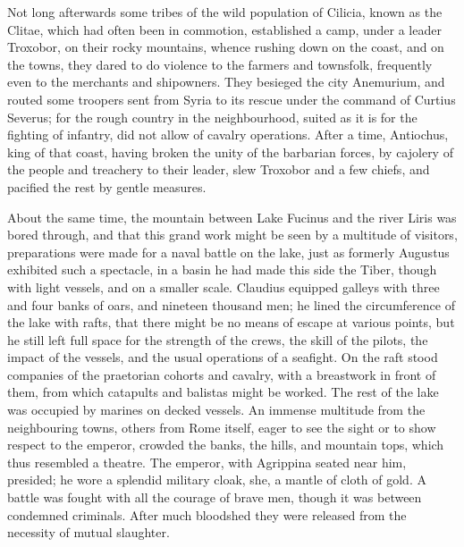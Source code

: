 
Not long afterwards some tribes of the wild population of Cilicia, known as the Clitae, which had often been in commotion, established a camp, under a leader Troxobor, on their rocky mountains, whence rushing down on the coast, and on the towns, they dared to do violence to the farmers and townsfolk, frequently even to the merchants and shipowners. They besieged the city Anemurium, and routed some troopers sent from Syria to its rescue under the command of Curtius Severus; for the rough country in the neighbourhood, suited as it is for the fighting of infantry, did not allow of cavalry operations. After a time, Antiochus, king of that coast, having broken the unity of the barbarian forces, by cajolery of the people and treachery to their leader, slew Troxobor and a few chiefs, and pacified the rest by gentle measures.


About the same time, the mountain between Lake Fucinus and the river Liris was bored through, and that this grand work might be seen by a multitude of visitors, preparations were made for a naval battle on the lake, just as formerly Augustus exhibited such a spectacle, in a basin he had made this side the Tiber, though with light vessels, and on a smaller scale. Claudius equipped galleys with three and four banks of oars, and nineteen thousand men; he lined the circumference of the lake with rafts, that there might be no means of escape at various points, but he still left full space for the strength of the crews, the skill of the pilots, the impact of the vessels, and the usual operations of a seafight. On the raft stood companies of the praetorian cohorts and cavalry, with a breastwork in front of them, from which catapults and balistas might be worked. The rest of the lake was occupied by marines on decked vessels. An immense multitude from the neighbouring towns, others from Rome itself, eager to see the sight or to show respect to the emperor, crowded the banks, the hills, and mountain tops, which thus resembled a theatre. The emperor, with Agrippina seated near him, presided; he wore a splendid military cloak, she, a mantle of cloth of gold. A battle was fought with all the courage of brave men, though it was between condemned criminals. After much bloodshed they were released from the necessity of mutual slaughter.


